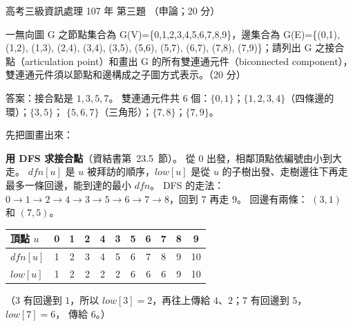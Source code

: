 \begin{pastexam}[label={px:gk3-107-ds-03}]{高考三級資訊處理 107 年 第三題}
（申論；20 分）

一無向圖 G 之節點集合為 G(V)=\{0,1,2,3,4,5,6,7,8,9\}，邊集合為 G(E)=\{(0,1), (1,2), (1,3), (2,4), (3,4), (3,5),
(5,6), (5,7), (6,7), (7,8), (7,9)\}；請列出 G 之接合點（articulation point）和畫出 G 的所有雙連通元件（biconnected
component），雙連通元件須以節點和邊構成之子圖方式表示。（20 分）
\end{pastexam}

\begin{pastsoln}
答案：接合點是 $1, 3, 5, 7$。 雙連通元件共 $6$ 個：$\{0, 1\}$；$\{1, 2, 3, 4\}$（四條邊的環）；$\{3, 5\}$；
$\{5, 6, 7\}$（三角形）；$\{7, 8\}$；$\{7, 9\}$。

先把圖畫出來：
\begin{center}
\end{center}

\textbf{用 DFS 求接合點}（資結書第~23.5~節）。 從 $0$ 出發，相鄰頂點依編號由小到大走。 $\mathit{dfn}[u]$ 是
$u$ 被拜訪的順序，$\mathit{low}[u]$ 是從 $u$ 的子樹出發、走樹邊往下再走最多一條回邊，能到達的最小
$\mathit{dfn}$。 DFS 的走法：$0 \to 1 \to 2 \to 4 \to 3 \to 5 \to 6 \to 7 \to 8$，回到 $7$ 再走 $9$。 回邊有兩條：
$(3, 1)$ 和 $(7, 5)$。
\begin{center}
\small
\begin{tabular}{l*{10}{c}}
\toprule
頂點 $u$ & 0 & 1 & 2 & 4 & 3 & 5 & 6 & 7 & 8 & 9 \\
\midrule
$\mathit{dfn}[u]$ & 1 & 2 & 3 & 4 & 5 & 6 & 7 & 8 & 9 & 10 \\
$\mathit{low}[u]$ & 1 & 2 & 2 & 2 & 2 & 6 & 6 & 6 & 9 & 10 \\
\bottomrule
\end{tabular}
\end{center}
（$3$ 有回邊到 $1$，所以 $\mathit{low}[3] = 2$，再往上傳給 $4$、$2$；$7$ 有回邊到 $5$，$\mathit{low}[7] = 6$，
傳給 $6$。）


\end{pastsoln}
